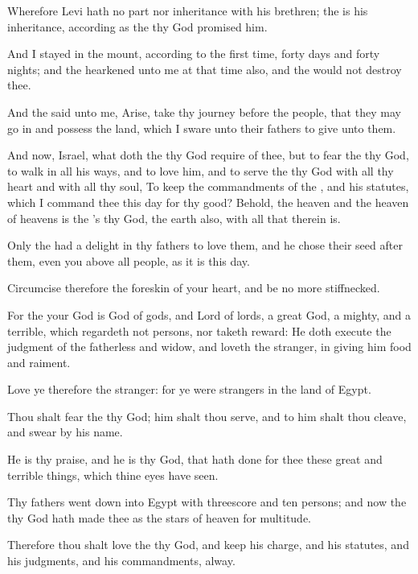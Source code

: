 \Verse Wherefore Levi hath no part nor inheritance with his brethren; the \LORD is his inheritance, according as the \LORD thy God promised him.

\Verse And I stayed in the mount, according to the first time, forty days and forty nights; and the \LORD hearkened unto me at that time also, and the \LORD would not destroy thee.

\Verse And the \LORD said unto me, Arise, take thy journey before the people, that they may go in and possess the land, which I sware unto their fathers to give unto them.

\Verse And now, Israel, what doth the \LORD thy God require of thee, but to fear the \LORD thy God, to walk in all his ways, and to love him, and to serve the \LORD thy God with all thy heart and with all thy soul, \Verse To keep the commandments of the \LORD, and his statutes, which I command thee this day for thy good?  \Verse Behold, the heaven and the heaven of heavens is the \LORD's thy God, the earth also, with all that therein is.

\Verse Only the \LORD had a delight in thy fathers to love them, and he chose their seed after them, even you above all people, as it is this day.

\Verse Circumcise therefore the foreskin of your heart, and be no more stiffnecked.

\Verse For the \LORD your God is God of gods, and Lord of lords, a great God, a mighty, and a terrible, which regardeth not persons, nor taketh reward: \Verse He doth execute the judgment of the fatherless and widow, and loveth the stranger, in giving him food and raiment.

\Verse Love ye therefore the stranger: for ye were strangers in the land of Egypt.

\Verse Thou shalt fear the \LORD thy God; him shalt thou serve, and to him shalt thou cleave, and swear by his name.

\Verse He is thy praise, and he is thy God, that hath done for thee these great and terrible things, which thine eyes have seen.

\Verse Thy fathers went down into Egypt with threescore and ten persons; and now the \LORD thy God hath made thee as the stars of heaven for multitude.


\Chapter
\Verse Therefore thou shalt love the \LORD thy God, and keep his charge, and his statutes, and his judgments, and his commandments, alway.

